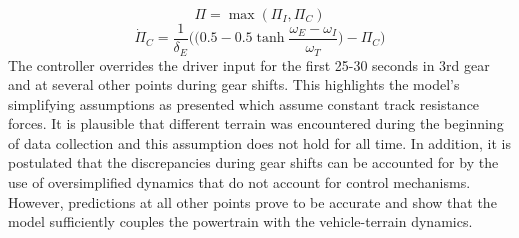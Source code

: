\begin{equation}
    \Pi = \max(\Pi_I,\Pi_C)
\end{equation}
\begin{equation}
    \dot\Pi_C = \frac{1}{\delta_E}\Bigg( \Big(0.5 - 0.5\tanh\frac{\omega_E-\omega_I}{\omega_T}\Big) - \Pi_C  \Bigg)
\end{equation}
The controller overrides the driver input for the first 25-30 seconds in 3rd gear and at several other points during gear shifts. This highlights the model's simplifying assumptions as presented which assume constant track resistance forces. It is plausible that different terrain was encountered during the beginning of data collection and this assumption does not hold for all time. In addition, it is postulated that the discrepancies during gear shifts can be accounted for by the use of oversimplified dynamics that do not account for control mechanisms. However, predictions at all other points prove to be accurate and show that the model sufficiently couples the powertrain with the vehicle-terrain dynamics.


